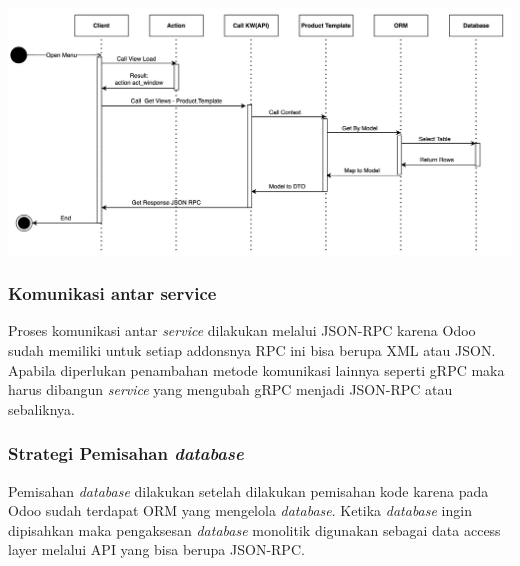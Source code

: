 \begin{center}
	\includegraphics[width=14cm]{img/bab_3/seqDiagGet.png}
	\label{fig:asd}
\end{center}
\subsubsection{Komunikasi antar service}
Proses komunikasi antar \textit{service} dilakukan melalui JSON-RPC karena Odoo sudah memiliki untuk setiap addonsnya RPC ini bisa berupa XML atau JSON. Apabila diperlukan penambahan metode komunikasi lainnya seperti gRPC maka harus dibangun \textit{service} yang mengubah gRPC menjadi JSON-RPC atau sebaliknya.  
\\
\subsubsection{Strategi Pemisahan \textit{database}}
Pemisahan \textit{database} dilakukan setelah dilakukan pemisahan kode karena pada Odoo sudah terdapat ORM yang mengelola \textit{database}. Ketika \textit{database} ingin dipisahkan maka pengaksesan \textit{database} monolitik  digunakan sebagai data access layer melalui API yang bisa berupa JSON-RPC.
\\
